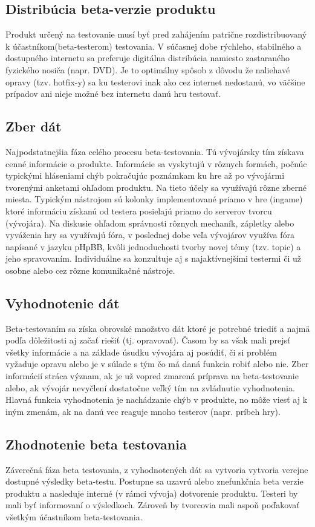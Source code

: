 \documentclass[10pt,twoside,slovak,a4paper]{article}
\begin{document}
\subsection{Distribúcia beta-verzie produktu}
Produkt určený na testovanie musí byť pred zahájením patrične rozdistribuovaný k účastníkom(beta-testerom) testovania. V súčasnej dobe rýchleho, stabilného a dostupného  internetu sa preferuje digitálna distribúcia namiesto zastaraného fyzického nosiča (napr. DVD). Je to optimálny spôsob z dôvodu že naliehavé opravy (tzv. hotfix-y) sa ku testerovi inak ako cez internet nedostanú, vo väčšine prípadov ani nieje možné bez internetu danú hru testovať.

\subsection{Zber dát}
Najpodstatnejšia fáza celého procesu beta-testovania. Tú vývojársky tím získava cenné informácie o produkte. Informácie sa vyskytujú v rôznych formách, počnúc typickými hláseniami chýb pokračujúc poznámkam ku hre až po vývojármi tvorenými anketami ohľadom produktu. Na tieto účely sa využívajú rôzne zberné miesta. Typickým nástrojom sú kolonky implementované priamo v hre (ingame) ktoré informáciu získanú od testera posielajú priamo do serverov tvorcu (vývojára). Na diskusie ohľadom správnosti rôznych mechaník, zápletky alebo vyváženia hry sa využívajú fóra, v poslednej dobe veľa vývojárov využíva fóra napísané v jazyku pHpBB, kvôli jednoduchosti tvorby novej témy (tzv. topic) a jeho spravovaním. Individuálne sa konzultuje aj s najaktívnejšími testermi či už osobne alebo cez rôzne komunikačné nástroje.

\subsection{Vyhodnotenie dát}
Beta-testovaním sa získa obrovské množstvo dát ktoré je potrebné triediť a najmä podľa dôležitosti aj začať riešiť (tj. opravovať). Časom by sa však mali prejsť všetky informácie a na základe úsudku vývojára aj posúdiť, či si problém vyžaduje opravu alebo je v súlade s tým čo má daná funkcia robiť alebo nie. Zber informácií stráca význam, ak je už vopred zmarená príprava na beta-testovanie alebo, ak vývojár nevyčlení dostatočne veľký tím na zvládnutie vyhodnotenia. Hlavná funkcia vyhodnotenia je nachádzanie chýb v produkte, no môže viesť aj k iným zmenám, ak na danú vec reaguje mnoho testerov (napr. príbeh hry).

\subsection{Zhodnotenie beta testovania}
Záverečná fáza beta testovania, z vyhodnotených dát sa vytvoria vytvoria verejne dostupné výsledky beta-testu. Postupne sa uzavrú alebo znefunkčnia beta verzie produktu a nasleduje interné (v rámci vývoja) dotvorenie produktu. Testeri by mali byť informovaní o výsledkoch. Zároveň by tvorcovia mali aspoň poďakovať všetkým účastníkom beta-testovania.
\end{document}
